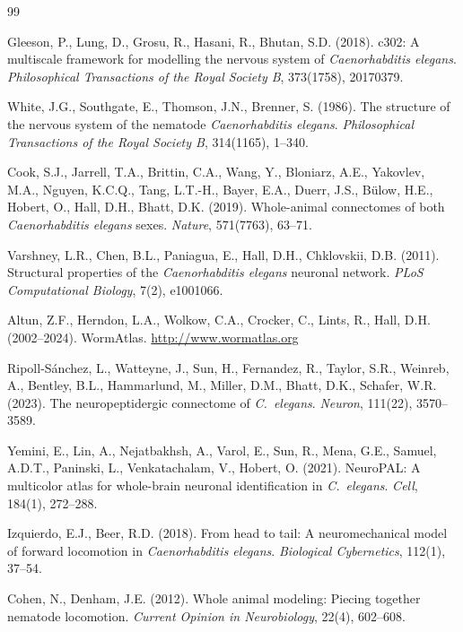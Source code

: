 \documentclass[12pt]{article}
\begin{document}
\begin{thebibliography}{99}


Gleeson, P., Lung, D., Grosu, R., Hasani, R., Bhutan, S.D. (2018). c302: A multiscale framework for modelling the nervous system of \textit{Caenorhabditis elegans}. \textit{Philosophical Transactions of the Royal Society B}, 373(1758), 20170379.

White, J.G., Southgate, E., Thomson, J.N., Brenner, S. (1986). The structure of the nervous system of the nematode \textit{Caenorhabditis elegans}. \textit{Philosophical Transactions of the Royal Society B}, 314(1165), 1--340.

Cook, S.J., Jarrell, T.A., Brittin, C.A., Wang, Y., Bloniarz, A.E., Yakovlev, M.A., Nguyen, K.C.Q., Tang, L.T.-H., Bayer, E.A., Duerr, J.S., B\"ulow, H.E., Hobert, O., Hall, D.H., Bhatt, D.K. (2019). Whole-animal connectomes of both \textit{Caenorhabditis elegans} sexes. \textit{Nature}, 571(7763), 63--71.

Varshney, L.R., Chen, B.L., Paniagua, E., Hall, D.H., Chklovskii, D.B. (2011). Structural properties of the \textit{Caenorhabditis elegans} neuronal network. \textit{PLoS Computational Biology}, 7(2), e1001066.

Altun, Z.F., Herndon, L.A., Wolkow, C.A., Crocker, C., Lints, R., Hall, D.H. (2002--2024). WormAtlas. \url{http://www.wormatlas.org}

Ripoll-S\'anchez, L., Watteyne, J., Sun, H., Fernandez, R., Taylor, S.R., Weinreb, A., Bentley, B.L., Hammarlund, M., Miller, D.M., Bhatt, D.K., Schafer, W.R. (2023). The neuropeptidergic connectome of \textit{C.~elegans}. \textit{Neuron}, 111(22), 3570--3589.

Yemini, E., Lin, A., Nejatbakhsh, A., Varol, E., Sun, R., Mena, G.E., Samuel, A.D.T., Paninski, L., Venkatachalam, V., Hobert, O. (2021). NeuroPAL: A multicolor atlas for whole-brain neuronal identification in \textit{C.~elegans}. \textit{Cell}, 184(1), 272--288.

Izquierdo, E.J., Beer, R.D. (2018). From head to tail: A neuromechanical model of forward locomotion in \textit{Caenorhabditis elegans}. \textit{Biological Cybernetics}, 112(1), 37--54.

Cohen, N., Denham, J.E. (2012). Whole animal modeling: Piecing together nematode locomotion. \textit{Current Opinion in Neurobiology}, 22(4), 602--608.


\end{thebibliography}
\end{document}
